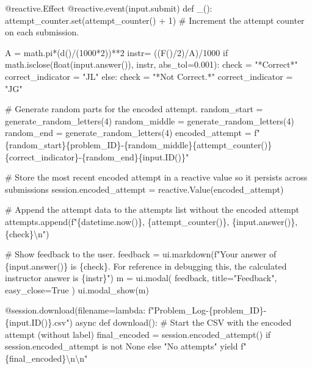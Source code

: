 \documentclass[
  letterpaper,
  DIV=11,
  numbers=noendperiod]{scrreprt}
\newenvironment{Shaded}{\begin{snugshade}}{\end{snugshade}}
\newcommand{\NormalTok}[1]{\textcolor[rgb]{0.00,0.23,0.31}{#1}}
\begin{document}
\begin{Shaded}
\begin{Highlighting}[]
\NormalTok{    @reactive.Effect}
\NormalTok{    @reactive.event(input.submit)}
\NormalTok{    def \_():}
\NormalTok{        attempt\_counter.set(attempt\_counter() + 1)  \# Increment the attempt counter on each submission.  }
      
\NormalTok{        A = math.pi*(d()/(1000*2))**2}
\NormalTok{        instr= ((F()/2)/A)/1000}
\NormalTok{        if math.isclose(float(input.answer()), instr, abs\_tol=0.001):}
\NormalTok{            check = "*Correct*"}
\NormalTok{            correct\_indicator = "JL"}
\NormalTok{        else:}
\NormalTok{            check = "*Not Correct.*"}
\NormalTok{            correct\_indicator = "JG"}

\NormalTok{        \# Generate random parts for the encoded attempt.}
\NormalTok{        random\_start = generate\_random\_letters(4)}
\NormalTok{        random\_middle = generate\_random\_letters(4)}
\NormalTok{        random\_end = generate\_random\_letters(4)}
\NormalTok{        encoded\_attempt = f"\{random\_start\}\{problem\_ID\}{-}\{random\_middle\}\{attempt\_counter()\}\{correct\_indicator\}{-}\{random\_end\}\{input.ID()\}"}

\NormalTok{        \# Store the most recent encoded attempt in a reactive value so it persists across submissions}
\NormalTok{        session.encoded\_attempt = reactive.Value(encoded\_attempt)}

\NormalTok{        \# Append the attempt data to the attempts list without the encoded attempt}
\NormalTok{        attempts.append(f"\{datetime.now()\}, \{attempt\_counter()\}, \{input.answer()\}, \{check\}\textbackslash{}n")}

\NormalTok{        \# Show feedback to the user.}
\NormalTok{        feedback = ui.markdown(f"Your answer of \{input.answer()\} is \{check\}. For reference in debugging this, the calculated instructor answer is \{instr\}")}
\NormalTok{        m = ui.modal(}
\NormalTok{            feedback,}
\NormalTok{            title="Feedback",}
\NormalTok{            easy\_close=True}
\NormalTok{        )}
\NormalTok{        ui.modal\_show(m)}

\NormalTok{    @session.download(filename=lambda: f"Problem\_Log{-}\{problem\_ID\}{-}\{input.ID()\}.csv")}
\NormalTok{    async def download():}
\NormalTok{        \# Start the CSV with the encoded attempt (without label)}
\NormalTok{        final\_encoded = session.encoded\_attempt() if session.encoded\_attempt is not None else "No attempts"}
\NormalTok{        yield f"\{final\_encoded\}\textbackslash{}n\textbackslash{}n"}
        

\end{Highlighting}
\end{Shaded}
\end{document}
